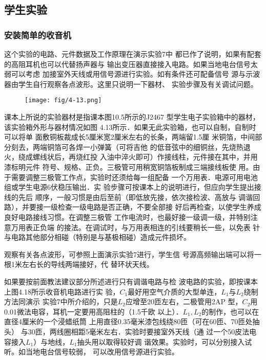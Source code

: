 \subsection{学生实验}
\subsubsection{安装简单的收音机}
这个实验的电路、元件数据及工作原理在演示实验7中
都已作了说明，如果有配套的高阻耳机也可以代替扬声器与
输出变压器直接接入电路。如果当地电台信号太弱可以考虑
加接室外天线或用信号源进行实验。如有条件还可配备信号
源与示波器由学生自行观察各点波形。这里只说明一下器材、
实验步骤及有关调试问题。

\begin{figure}[htp]
    \centering
\texttt{[image: fig/4-13.png]}
    \caption{}
\end{figure}

课本上所说的实验器材是指课本图10.5所示的J2467
型学生电子实验箱中的器材，该实验箱外形与器材情况如图
4.13所示．如果无此实验箱，也可以自制，自制时可以将单
面敷铜板裁成长5厘米宽2厘米左右的长条，两端留1.5厘
米铜箔，中间部分刻去，两端铜箔可各焊一小弹簧（可将吉他
的低音弦中的细铜丝，先烧热退火，绕成螺线状后，再烧红投
入油中淬火即可）作接线柱，元件接在其中，并用漆标明元件
符号、规格、正负。三极管可用稍宽铜箔板制成三端接线板使
用。由于需要调整三极管工作点，实验时还须给每一组配备
一个万用表．电源可用电池组或学生电源6伏稳压输出．实
验步骤可按课本上的说明进行，但应向学生提出接线的先后
顺序，一般习惯是由后至前（即低放先接，依次接检波、高放与
调谐回路），并要接一级检查一级电路是否正确，不要全部接
好后再检查，以使学生养成良好电路接线习惯。在调整三极管
工作电流时，也最好接一级调一级，并特别注意万用表正负端
的接法。在调试时，与万用表相连的引线要稍长一些，以免表
针与电路其他部分相碰（特别是与基极相碰）造成元件损坏。

观察有关各点波形，可参照上面演示实验7进行，学生信
号源高频输出端可以将一根1米左右长的导线两端接好，代
替环状天线。

如果要按前面教法建议部分所述进行只有调谐电路与检
波电路的实验，即按课本上图4.18所示收音机电路进行实
验，$C_1$最好用空气介质的大型单连，$L_1$与$L_2$绕制方法同演示
实验7中所介绍的，只是$L_2$应增至20匝左右，二极管用2AP
型，$C_2$用0.01微法电容，耳机一定要用高阻柱的（1.5千欧
以上）．$L_1,L_2$的制作，也可以在直径4厘米的一个浸蜡纸筒
上用直径0.35毫米漆包线绕80匝（可在60匝、70匝处抽头）
与30匝，两线圈相距5毫米左右．实验时要接室外天线（通
过一个50皮法电容接入$L_1$）与地线，$L_1$抽头用以取得较好调
谐效果。实验时，可以分别接入试听。如当地电台信号较弱，
可以改用信号源进行实验。


